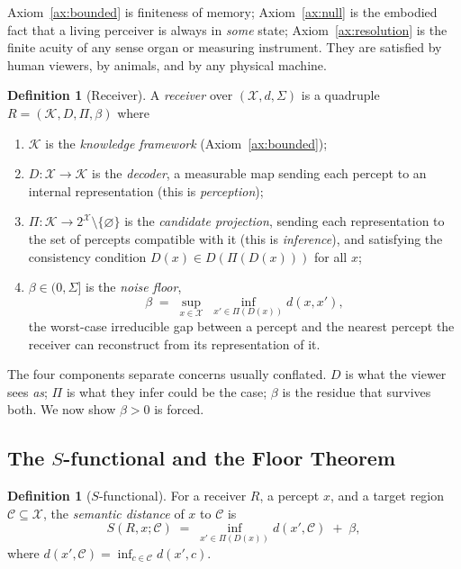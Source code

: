 \documentclass[twocolumn,11pt,a4paper]{article}
\theoremstyle{adv}
\theoremstyle{definition}
\newtheorem{definition}[theorem]{Definition}
\theoremstyle{remark}
\newcommand{\Out}{\mathcal{X}}         %
\newcommand{\Know}{\mathcal{K}}        %
\newcommand{\Cell}{\mathcal{C}}        %
\newcommand{\Dec}{D}                   %
\newcommand{\Proj}{\Pi}                %
\newcommand{\Recv}{R}                  %
\newcommand{\Sval}{S}                  %
\newcommand{\floor}{\beta}            %
\newcommand{\dist}{d}
\newcommand{\Sig}{\Sigma}
\begin{document}
Axiom~\ref{ax:bounded} is finiteness of memory; Axiom~\ref{ax:null} is the
embodied fact that a living perceiver is always in \emph{some} state;
Axiom~\ref{ax:resolution} is the finite acuity of any sense organ or
measuring instrument. They are satisfied by human viewers, by animals, and
by any physical machine.

\begin{definition}[Receiver]
\label{def:receiver}
A \emph{receiver} over $(\Out,\dist,\Sig)$ is a quadruple
$\Recv=(\Know,\Dec,\Proj,\floor)$ where
\begin{enumerate}[label=(\roman*),leftmargin=1.8em,itemsep=1pt]
\item $\Know$ is the \emph{knowledge framework} (Axiom~\ref{ax:bounded});
\item $\Dec:\Out\to\Know$ is the \emph{decoder}, a measurable map sending
  each percept to an internal representation (this is \emph{perception});
\item $\Proj:\Know\to 2^{\Out}\setminus\{\varnothing\}$ is the
  \emph{candidate projection}, sending each representation to the set of
  percepts compatible with it (this is \emph{inference}), and satisfying
  the consistency condition $\Dec(x)\in\Dec(\Proj(\Dec(x)))$ for all $x$;
\item $\floor\in(0,\Sig]$ is the \emph{noise floor},
  \[
    \floor \;=\; \sup_{x\in\Out}\;\inf_{x'\in\Proj(\Dec(x))}\dist(x,x'),
  \]
  the worst-case irreducible gap between a percept and the nearest percept
  the receiver can reconstruct from its representation of it.
\end{enumerate}
\end{definition}

The four components separate concerns usually conflated. $\Dec$ is what
the viewer sees \emph{as}; $\Proj$ is what they infer could be the case;
$\floor$ is the residue that survives both. We now show $\floor>0$ is
forced.

\subsection{The $S$-functional and the Floor Theorem}

\begin{definition}[$S$-functional]
\label{def:sfunctional}
For a receiver $\Recv$, a percept $x$, and a target region
$\Cell\subseteq\Out$, the \emph{semantic distance} of $x$ to $\Cell$ is
\[
  \Sval(\Recv,x;\Cell)\;=\;\inf_{x'\in\Proj(\Dec(x))}\dist(x',\Cell)\;+\;\floor,
\]
where $\dist(x',\Cell)=\inf_{c\in\Cell}\dist(x',c)$.
\end{definition}
\end{document}
